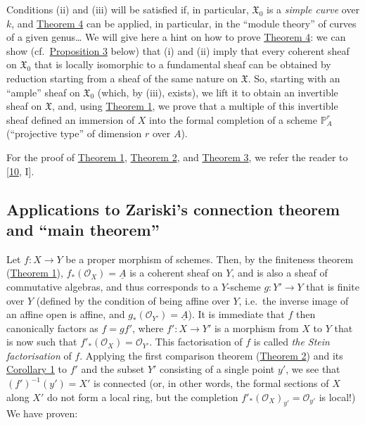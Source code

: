 \documentclass{article}
\theoremstyle{definition}
\theoremstyle{definition}
\theoremstyle{definition}
\theoremstyle{definition}
\theoremstyle{remark}
\begin{document}
Conditions (ii) and (iii) will be satisfied if, in particular, \({\mathfrak{X}}_0\) is a \emph{simple curve} over \(k\), and \protect\hyperlink{fga-2-theorem-4}{Theorem 4} can be applied, in particular, in the ``module theory'' of curves of a given genus\ldots{}
We will give here a hint on how to prove \protect\hyperlink{fga-2-theorem-4}{Theorem 4}:
we can show (cf.~\protect\hyperlink{fga-2-proposition-3}{Proposition 3} below) that (i) and (ii) imply that every coherent sheaf on \({\mathfrak{X}}_0\) that is locally isomorphic to a fundamental sheaf can be obtained by reduction starting from a sheaf of the same nature on \({\mathfrak{X}}\).
So, starting with an ``ample'' sheaf on \({\mathfrak{X}}_0\) (which, by (iii), exists), we lift it to obtain an invertible sheaf on \({\mathfrak{X}}\), and, using \protect\hyperlink{fga-2-theorem-1}{Theorem 1}, we prove that a multiple of this invertible sheaf defined an immersion of \(X\) into the formal completion of a scheme \(\mathbb{P}_A^r\) (``projective type'' of dimension \(r\) over \(A\)).

For the proof of \protect\hyperlink{fga-2-theorem-1}{Theorem 1}, \protect\hyperlink{fga-2-theorem-2}{Theorem 2}, and \protect\hyperlink{fga-2-theorem-3}{Theorem 3}, we refer the reader to {[}\protect\hyperlink{ref-GD1960}{10}, I{]}.

\hypertarget{fga-2-section-4}{%
\subsection{Applications to Zariski's connection theorem and ``main theorem''}\label{fga-2-section-4}}

Let \(f\colon X\to Y\) be a proper morphism of schemes.
Then, by the finiteness theorem (\protect\hyperlink{fga-2-theorem-1}{Theorem 1}), \(f_*({\mathscr{O}}_X)=\underline{A}\) is a coherent sheaf on \(Y\), and is also a sheaf of commutative algebras, and thus corresponds to a \(Y\)-scheme \(g\colon Y'\to Y\) that is finite over \(Y\) (defined by the condition of being affine over \(Y\), i.e.~the inverse image of an affine open is affine, and \(g_*({\mathscr{O}}_{Y'})=\underline{A}\)).
It is immediate that \(f\) then canonically factors as \(f=gf'\), where \(f'\colon X\to Y'\) is a morphism from \(X\) to \(Y\) that is now such that \(f'_*({\mathscr{O}}_X)={\mathscr{O}}_{Y'}\).
This factorisation of \(f\) is called \emph{the Stein factorisation} of \(f\).
Applying the first comparison theorem (\protect\hyperlink{fga-2-theorem-2}{Theorem 2}) and its \protect\hyperlink{fga-2-theorem-2-corollary-1}{Corollary 1} to \(f'\) and the subset \(Y'\) consisting of a single point \(y'\), we see that \((f')^{-1}(y')=X'\) is connected (or, in other words, the formal sections of \(X\) along \(X'\) do not form a local ring, but the completion \(f'_*({\mathscr{O}}_X)_{y'}={\mathscr{O}}_{y'}\) is local!)
We have proven:
\end{document}
